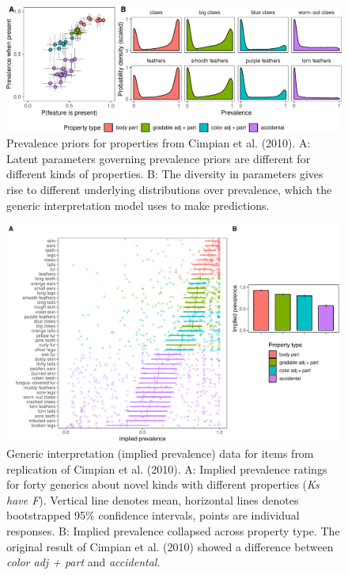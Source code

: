 \documentclass[floatsintext,doc]{apa6}
\begin{document}
\begin{figure}
\centering
\includegraphics{genint_files/figure-latex/cimpian-prevPrior-1.pdf}
\caption{\label{fig:cimpian-prevPrior}Prevalence priors for properties from
Cimpian et al. (2010). A: Latent parameters governing prevalence priors
are different for different kinds of properties. B: The diversity in
parameters gives rise to different underlying distributions over
prevalence, which the generic interpretation model uses to make
predictions.}
\end{figure}


\begin{figure}
\centering
\includegraphics{figs/cimpian-results}
\caption{\label{fig:cimpian-modelingResults}Generic interpretation (implied prevalence) data for items from replication of Cimpian et al. (2010). A: Implied prevalence ratings for forty generics about novel kinds with different properties (\emph{Ks have F}). Vertical line denotes mean, horizontal lines denotes bootstrapped 95\% confidence intervals, points are individual responses. B: Implied prevalence collapsed across property type. The original result of Cimpian et al. (2010) showed a difference between \emph{color adj + part} and \emph{accidental}.}
\end{figure}
\end{document}
